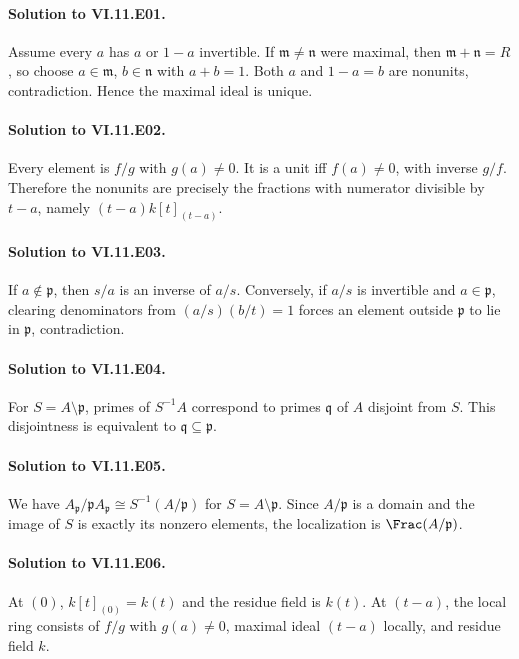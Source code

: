 \paragraph{Solution to VI.11.E01.}
Assume every $a$ has $a$ or $1-a$ invertible.  If $\mathfrak m\neq\mathfrak n$ were maximal, then $\mathfrak m+\mathfrak n=R$, so choose $a\in\mathfrak m$, $b\in\mathfrak n$ with $a+b=1$.  Both $a$ and $1-a=b$ are nonunits, contradiction.  Hence the maximal ideal is unique.

\paragraph{Solution to VI.11.E02.}
Every element is $f/g$ with $g(a)\neq0$.  It is a unit iff $f(a)\neq0$, with inverse $g/f$.  Therefore the nonunits are precisely the fractions with numerator divisible by $t-a$, namely $(t-a)k[t]_{(t-a)}$.

\paragraph{Solution to VI.11.E03.}
If $a\notin\mathfrak p$, then $s/a$ is an inverse of $a/s$.  Conversely, if $a/s$ is invertible and $a\in\mathfrak p$, clearing denominators from $(a/s)(b/t)=1$ forces an element outside $\mathfrak p$ to lie in $\mathfrak p$, contradiction.

\paragraph{Solution to VI.11.E04.}
For $S=A\setminus\mathfrak p$, primes of $S^{-1}A$ correspond to primes $\mathfrak q$ of $A$ disjoint from $S$.  This disjointness is equivalent to $\mathfrak q\subseteq\mathfrak p$.

\paragraph{Solution to VI.11.E05.}
We have $A_{\mathfrak p}/\mathfrak pA_{\mathfrak p}\cong S^{-1}(A/\mathfrak p)$ for $S=A\setminus\mathfrak p$.  Since $A/\mathfrak p$ is a domain and the image of $S$ is exactly its nonzero elements, the localization is $\Frac(A/\mathfrak p)$.

\paragraph{Solution to VI.11.E06.}
At $(0)$, $k[t]_{(0)}=k(t)$ and the residue field is $k(t)$.  At $(t-a)$, the local ring consists of $f/g$ with $g(a)\neq0$, maximal ideal $(t-a)$ locally, and residue field $k$.

